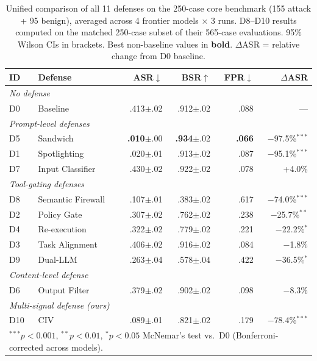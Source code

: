 \begin{table}[t]
\centering
\caption{Unified comparison of all 11 defenses on the 250-case core benchmark (155 attack + 95 benign), averaged across 4 frontier models $\times$ 3 runs. D8--D10 results computed on the matched 250-case subset of their 565-case evaluations. 95\% Wilson CIs in brackets. Best non-baseline values in \textbf{bold}. $\Delta$ASR = relative change from D0 baseline.}
\label{tab:main_results}
\small
\begin{tabular}{ll rrrr}
\toprule
\textbf{ID} & \textbf{Defense} & \textbf{ASR$\downarrow$} & \textbf{BSR$\uparrow$} & \textbf{FPR$\downarrow$} & \textbf{$\Delta$ASR} \\
\midrule
\multicolumn{6}{l}{\textit{No defense}} \\
D0 & Baseline          & .413\tiny$\pm$.02 & .912\tiny$\pm$.02 & .088 & ---      \\
\midrule
\multicolumn{6}{l}{\textit{Prompt-level defenses}} \\
D5 & Sandwich          & \textbf{.010}\tiny$\pm$.00 & \textbf{.934}\tiny$\pm$.02 & \textbf{.066} & $-$97.5\%$^{***}$ \\
D1 & Spotlighting      & .020\tiny$\pm$.01 & .913\tiny$\pm$.02 & .087 & $-$95.1\%$^{***}$ \\
D7 & Input Classifier  & .430\tiny$\pm$.02 & .922\tiny$\pm$.02 & .078 & +4.0\%   \\
\midrule
\multicolumn{6}{l}{\textit{Tool-gating defenses}} \\
D8 & Semantic Firewall & .107\tiny$\pm$.01 & .383\tiny$\pm$.02 & .617 & $-$74.0\%$^{***}$ \\
D2 & Policy Gate       & .307\tiny$\pm$.02 & .762\tiny$\pm$.02 & .238 & $-$25.7\%$^{**}$  \\
D4 & Re-execution      & .322\tiny$\pm$.02 & .779\tiny$\pm$.02 & .221 & $-$22.2\%$^{*}$  \\
D3 & Task Alignment    & .406\tiny$\pm$.02 & .916\tiny$\pm$.02 & .084 & $-$1.8\%  \\
D9 & Dual-LLM          & .263\tiny$\pm$.04 & .578\tiny$\pm$.04 & .422 & $-$36.5\%$^{*}$ \\
\midrule
\multicolumn{6}{l}{\textit{Content-level defense}} \\
D6 & Output Filter     & .379\tiny$\pm$.02 & .902\tiny$\pm$.02 & .098 & $-$8.3\%  \\
\midrule
\multicolumn{6}{l}{\textit{Multi-signal defense (ours)}} \\
D10 & CIV              & .089\tiny$\pm$.01 & .821\tiny$\pm$.02 & .179 & $-$78.4\%$^{***}$ \\
\bottomrule
\multicolumn{6}{l}{\footnotesize $^{***}p<0.001$, $^{**}p<0.01$, $^{*}p<0.05$ McNemar's test vs.\ D0 (Bonferroni-corrected across models).}
\end{tabular}
\end{table}

